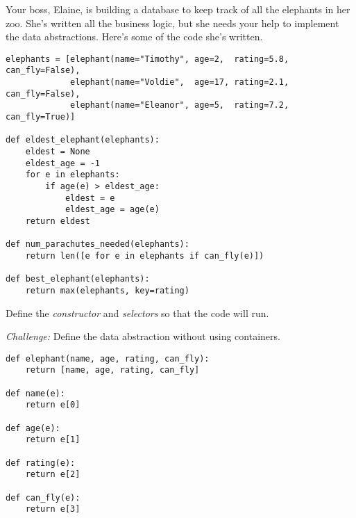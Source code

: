 \begin{blocksection}
\question Your boss, Elaine, is building a database to keep track of all the elephants in her zoo. She's written all the business logic, but she needs your help to implement the data abstractions. Here's some of the code she's written.

\begin{lstlisting}
elephants = [elephant(name="Timothy", age=2,  rating=5.8, can_fly=False),
             elephant(name="Voldie",  age=17, rating=2.1, can_fly=False),
             elephant(name="Eleanor", age=5,  rating=7.2, can_fly=True)]

def eldest_elephant(elephants):
    eldest = None
    eldest_age = -1
    for e in elephants:
        if age(e) > eldest_age:
            eldest = e
            eldest_age = age(e)
    return eldest

def num_parachutes_needed(elephants):
    return len([e for e in elephants if can_fly(e)])

def best_elephant(elephants):
    return max(elephants, key=rating)
\end{lstlisting}

Define the \emph{constructor} and \emph{selectors} so that the code will run.

\emph{Challenge:} Define the data abstraction without using containers.

\begin{solution}[3in]
\begin{lstlisting}
def elephant(name, age, rating, can_fly):
    return [name, age, rating, can_fly]

def name(e):
    return e[0]

def age(e):
    return e[1]

def rating(e):
    return e[2]

def can_fly(e):
    return e[3]
\end{lstlisting}
\end{solution}
\end{blocksection}
